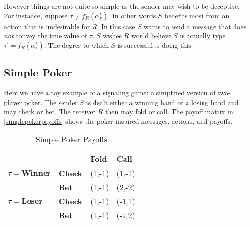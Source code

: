 \documentclass{article}
\begin{document}
However things are not quite so simple as the sender may wish to be deceptive. For instance, suppose $\tau \ne f_R(\alpha_\tau^*)$. In other words $S$ benefits most from an action that is undesirable for $R$. In this case $S$ wants to send a message that does \emph{not} convey the true value of $\tau$. $S$ wishes $R$ would believe $S$ is actually type $\tau^\prime = f_R(\alpha_\tau^*)$. The degree to which $S$ is successful is doing this 

\subsection{Simple Poker}
\label{ssec:SimplePoker}

Here we have a toy example of a signaling game: a simplified version of two-player poker. The sender $S$ is dealt either a winning hand or a losing hand and may check or bet. The receiver $R$ then may fold or call. The payoff matrix in \autoref{simplepokerpayoffs} shows the poker-inspired messages, actions, and payoffs.

\begin{table}[H]
	\centering
	\caption{Simple Poker Payoffs}
	\label{simplepokerpayoffs}
	\begin{tabular}{ll|l|l|}
		\cline{3-4}&       & \textbf{Fold} & \textbf{Call} \\ \hline
		\multicolumn{1}{|l|}{$\tau=\textbf{Winner}$} & \textbf{Check} & (1,-1)  & (1,-1)  \\ \cline{2-4}
		\multicolumn{1}{|l|}{}        & \textbf{Bet}   & (1,-1)  & (2,-2)  \\ \hline
		\multicolumn{1}{|l|}{$\tau=\textbf{Loser}$}  & \textbf{Check} & (1,-1)  & (-1,1)  \\ \cline{2-4}
		\multicolumn{1}{|l|}{}        & \textbf{Bet}   & (1,-1)  & (-2,2) \\ \hline
	\end{tabular}
\end{table}
\end{document}

